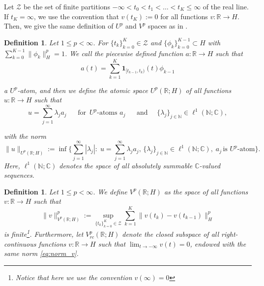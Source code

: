 \documentclass[letterpaper, 11pt,  reqno]{amsart}
\newtheorem{definition}[theorem]{Definition}
\newcommand{\1}{\hspace{0.5mm}\text{I}\hspace{0.5mm}}
\newcommand{\noi}{\noindent}
\newcommand{\R}{\mathbb{R}}
\newcommand{\C}{\mathbb{C}}
\newcommand{\ld}{\lambda}
\renewcommand{\l}{\ell}
\newcommand{\ind}{\mathbf 1}
\newcommand{\N}{\mathbb{N}}
\numberwithin{equation}{section}
\numberwithin{theorem}{section}
\begin{document}
Let $\mathcal{Z}$ be the set of finite partitions
$-\infty<t_0<t_1< \dots <t_K\leq \infty$ of the real line. If
$t_K=\infty$, we use the convention that $v(t_K):=0$ for all functions
$v: \R \to H$.
Then, we give the same definition of $U^p$ and $V^p$ spaces as in \cite{HHK09}. 



\begin{definition}\label{def:u}
\rm
Let $1\leq p <\infty$. For $\{t_k\}_{k=0}^K \in \mathcal{Z}$ and
$\{\phi_k\}_{k=0}^{K-1} \subset H$ with
$\sum_{k=0}^{K-1}\|\phi_k\|_{H}^p=1$.
We call the piecewise
defined function $a:\R \to H$ such that
\begin{equation*}
    a(t) =\sum_{k=1}^K\ind_{[t_{k-1},t_k)} (t) \phi_{k-1}
\end{equation*}
  
   
  
\noi
a $U^p$-atom,
 and then we define the atomic space $U^p(\R;H)$ of all
functions $u: \R \to H$ such that
\begin{equation*}
    u=\sum_{j=1}^\infty \lambda_j a_j \; 
 \quad 
 \text{  for  }\,
  U^p\text{-atoms } a_j \;
  \quad \text{ and } \quad
    \{\ld_j\}_{j \in \N} \in \l^1(\N; \C),
\end{equation*}

   
  
\noi
with the norm
\[
    \|u\|_{U^p(\R; H)} :=\inf \Big\{\sum_{j=1}^\infty |\lambda_j|
      :\; u=\sum_{j=1}^\infty \lambda_j a_j,
      \, \{ \lambda_j \}_{j \in \N} \in \l^1 (\N; \C) , \; a_j \, \text{is  $U^p$-atom}\Big\}.
\]
Here, $\l^1(\N; \C)$ denotes the space of all absolutely summable $\C$-valued sequences.
\end{definition}



\begin{definition}\label{def:v}
\rm
Let $1\leq p<\infty$.
We define $V^p(\R;H)$ as the space of all functions $v:\R\to H$ such that
\begin{equation}\label{eq:norm_v}
    \|v\|_{V^p(\R; H)}^p
    :=\sup_{\{t_k\}_{k=0}^K \in \mathcal{Z}} \sum_{k=1}^{K}
    \|v(t_{k})-v(t_{k-1})\|_{H}^p
\end{equation}
is finite\footnote{Notice that here we use the convention $v(\infty)=0$}.
Furthermore, let $V^p_{rc}(\R;H)$ denote the closed subspace of all right-continuous functions $v:\R\to H$ such that $\lim_{t\to -\infty}v(t)=0$, endowed with the same norm \eqref{eq:norm_v}.

\end{definition}
\end{document}
